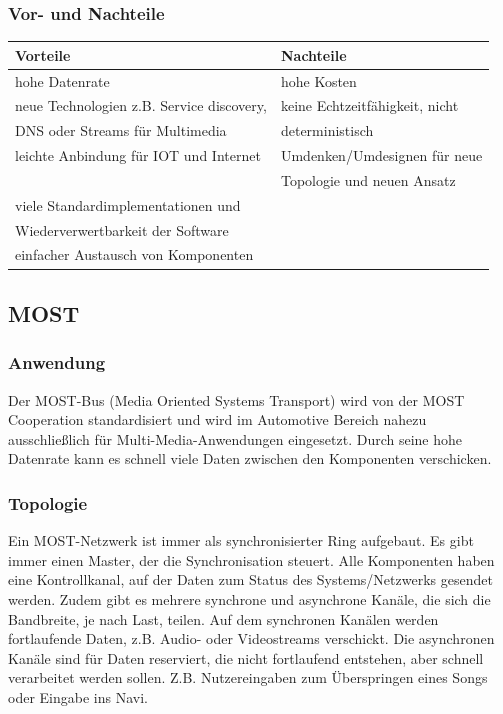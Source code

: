 \subsubsection{Vor- und Nachteile}
\begin{tabular}{l|l}
	\textbf{Vorteile} & \textbf{Nachteile}\\
	\hline hohe Datenrate & hohe Kosten\\
	\hline neue Technologien z.B. Service discovery,  & keine Echtzeitfähigkeit, nicht\\
	DNS oder Streams für Multimedia & deterministisch\\
	\hline leichte Anbindung für IOT und Internet & Umdenken/Umdesignen für neue \\
	& Topologie und neuen Ansatz\\
	\hline viele Standardimplementationen und&\\
	Wiederverwertbarkeit der Software&\\
	\hline einfacher Austausch von Komponenten &\\
\end{tabular}

\subsection{MOST}		
\subsubsection{Anwendung}
Der MOST-Bus (Media Oriented Systems Transport) wird von der MOST Cooperation standardisiert und wird im Automotive Bereich nahezu ausschließlich für Multi-Media-Anwendungen eingesetzt. Durch seine hohe Datenrate kann es schnell viele Daten zwischen den Komponenten verschicken.


\cite{.MH_Vehicle}

\subsubsection{Topologie}
Ein MOST-Netzwerk ist immer als synchronisierter Ring aufgebaut. Es gibt immer einen Master, der die Synchronisation steuert. Alle Komponenten haben eine Kontrollkanal, auf der Daten zum Status des Systems/Netzwerks gesendet werden. Zudem gibt es mehrere synchrone und asynchrone Kanäle, die sich die Bandbreite, je nach Last, teilen.
Auf dem synchronen Kanälen werden fortlaufende Daten, z.B. Audio- oder Videostreams verschickt.
Die asynchronen Kanäle sind für Daten reserviert, die nicht fortlaufend entstehen, aber schnell verarbeitet werden sollen. Z.B. Nutzereingaben zum Überspringen eines Songs oder Eingabe ins Navi. \cite{BP01}

